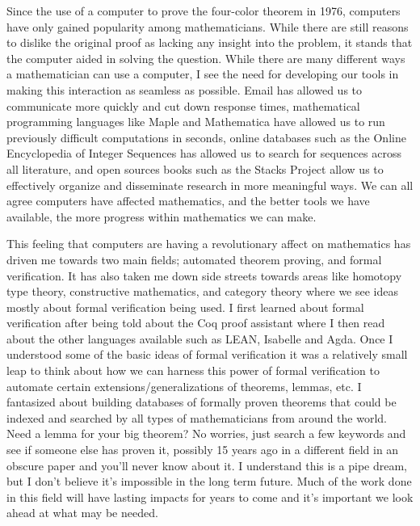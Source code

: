 \documentclass[11pt]{article}
\begin{document}
Since the use of a computer to prove the four-color theorem in 1976, computers have only gained popularity among mathematicians. While there are still reasons to dislike the original proof as lacking any insight into the problem, it stands that the computer aided in solving the question. While there are many different ways a mathematician can use a computer, I see the need for developing our tools in making this interaction as seamless as possible. Email has allowed us to communicate more quickly and cut down response times, mathematical programming languages like Maple and Mathematica have allowed us to run previously difficult computations in seconds, online databases such as the Online Encyclopedia of Integer Sequences has allowed us to search for sequences across all literature, and open sources books such as the Stacks Project allow us to effectively organize and disseminate research in more meaningful ways. We can all agree computers have affected mathematics, and the better tools we have available, the more progress within mathematics we can make.

This feeling that computers are having a revolutionary affect on mathematics has driven me towards two main fields; automated theorem proving, and formal verification. It has also taken me down side streets towards areas like homotopy type theory, constructive mathematics, and category theory where we see ideas mostly about formal verification being used. I first learned about formal verification after being told about the Coq proof assistant where I then read about the other languages available such as LEAN, Isabelle and Agda. Once I understood some of the basic ideas of formal verification it was a relatively small leap to think about how we can harness this power of formal verification to automate certain extensions/generalizations of theorems, lemmas, etc. I fantasized about building databases of formally proven theorems that could be indexed and searched by all types of mathematicians from around the world. Need a lemma for your big theorem? No worries, just search a few keywords and see if someone else has proven it, possibly 15 years ago in a different field in an obscure paper and you'll never know about it. I understand this is a pipe dream, but I don't believe it's impossible in the long term future. Much of the work done in this field will have lasting impacts for years to come and it's important we look ahead at what may be needed.
\end{document}
